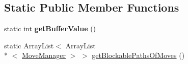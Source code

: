 \subsection*{Static Public Member Functions}
\begin{DoxyCompactItemize}
\item 
\hypertarget{enumenums_1_1_level_three_legal_moves_a166d665ed12cb6800e386dbbe930a919}{static int {\bfseries get\-Buffer\-Value} ()}\label{enumenums_1_1_level_three_legal_moves_a166d665ed12cb6800e386dbbe930a919}

\item 
static Array\-List$<$ Array\-List\\*
$<$ \hyperlink{interfaceinterfaces_1_1_move_manager}{Move\-Manager} $>$ $>$ \hyperlink{enumenums_1_1_level_three_legal_moves_a517763764cee78db9f4a5d25ae5c4668}{get\-Blockable\-Paths\-Of\-Moves} ()
\end{DoxyCompactItemize}
